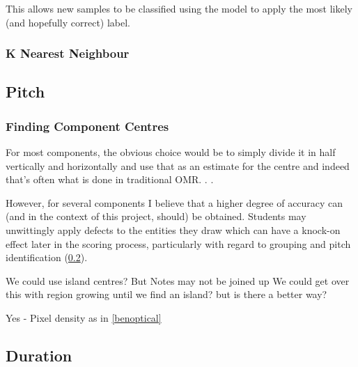 This allows new samples to be classified using the model to apply the most likely (and hopefully correct) label.

\subsubsection{K Nearest Neighbour}

\subsection{Pitch}
\label{sec:pitch-identification}

\subsubsection{Finding Component Centres}

For most components, the obvious choice would be to simply divide it in half vertically and horizontally and use that as an estimate for the centre and indeed that's often what is done in traditional OMR. .
.

However, for several components I believe that a higher degree of accuracy can (and in the context of this project, should) be obtained. Students may unwittingly apply defects to the entities they draw which can have a knock-on effect later in the scoring process, particularly with regard to grouping and pitch identification (\cref{sec:pitch-identification}).

We could use island centres? But Notes may not be joined up
We could get over this with region growing until we find an island? but is there a better way?

Yes - Pixel density as in \cref{benoptical}


\subsection{Duration}
\label{sec:pitch-identification}

